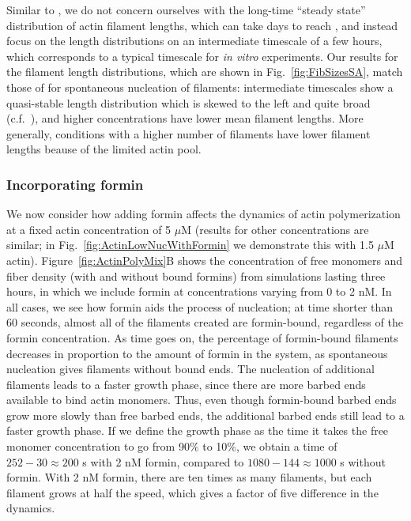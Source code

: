 \documentclass[11pt]{article}
\begin{document}
Similar to \cite{banerjee2022emergence}, we do not concern ourselves with the long-time ``steady state'' distribution of actin filament lengths, which can take days to reach \cite{hu2007theoretical, fass2008stochastic, mohapatra2017limiting}, and instead focus on the length distributions on an intermediate timescale of a few hours, which corresponds to a typical timescale for \emph{in vitro} experiments. Our results for the filament length distributions, which are shown in Fig.\ \ref{fig:FibSizesSA}, match those of \cite{banerjee2022emergence} for spontaneous nucleation of filaments: intermediate timescales show a quasi-stable length distribution which is skewed to the left and quite broad (c.f.\ \cite[Fig.~2c]{banerjee2022emergence}), and higher concentrations have lower mean filament lengths. More generally, conditions with a higher number of filaments have lower filament lengths beause of the limited actin pool.

\subsubsection{Incorporating formin}
We now consider how adding formin affects the dynamics of actin polymerization at a fixed actin concentration of 5 $\mu$M (results for other concentrations are similar; in Fig.\ \ref{fig:ActinLowNucWithFormin} we demonstrate this with 1.5 $\mu$M actin). Figure\ \ref{fig:ActinPolyMix}B shows the concentration of free monomers and fiber density (with and without bound formins) from simulations lasting three hours, in which we include formin at concentrations varying from 0 to 2 nM. In all cases, we see how formin aids the process of nucleation; at time shorter than 60 seconds, almost all of the filaments created are formin-bound, regardless of the formin concentration. As time goes on, the percentage of formin-bound filaments decreases in proportion to the amount of formin in the system, as spontaneous nucleation gives filaments without bound ends. 
The nucleation of additional filaments leads to a faster growth phase, since there are more barbed ends available to bind actin monomers. Thus, even though formin-bound barbed ends grow more slowly than free barbed ends, the additional barbed ends still lead to a faster growth phase. If we define the growth phase as the time it takes the free monomer concentration to go from 90\% to 10\%, we obtain a time of $252-30\approx 200$ s with 2 nM formin, compared to $1080-144 \approx 1000$ s without formin. With 2 nM formin, there are ten times as many filaments, but each filament grows at half the speed, which gives a factor of five difference in the dynamics.
\end{document}

